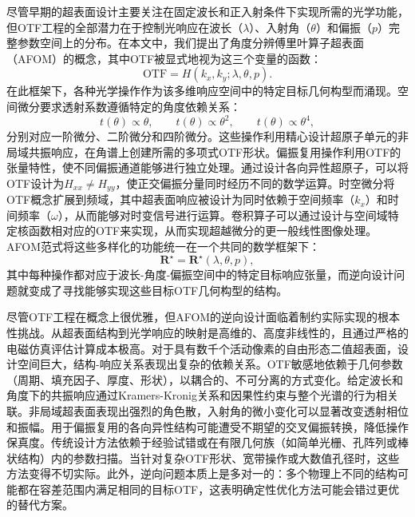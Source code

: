 尽管早期的超表面设计主要关注在固定波长和正入射条件下实现所需的光学功能，但OTF工程的全部潜力在于控制光响应在波长（$\lambda$）、入射角（$\theta$）和偏振（$p$）完整参数空间上的分布。在本文中，我们提出了角度分辨傅里叶算子超表面（AFOM）的概念，其中OTF被显式地视为这三个变量的函数：
\[
\mathrm{OTF} = H(k_x, k_y; \lambda, \theta, p).
\]
在此框架下，各种光学操作作为该多维响应空间中的特定目标几何构型而涌现。空间微分要求透射系数遵循特定的角度依赖关系：
\[
t(\theta) \propto \theta, \qquad
t(\theta) \propto \theta^2, \qquad
t(\theta) \propto \theta^4,
\]
分别对应一阶微分\cite{silva2014}、二阶微分\cite{zhu2017,kwon2018}和四阶微分\cite{qiu2025highorder}。这些操作利用精心设计超原子单元的非局域共振响应，在角谱上创建所需的多项式OTF形状。偏振复用操作利用OTF的张量特性，使不同偏振通道能够进行独立处理\cite{deng2024,cotrufo2023natcom}。通过设计各向异性超原子，可以将OTF设计为$H_{xx} \neq H_{yy}$，使正交偏振分量同时经历不同的数学运算。时空微分将OTF概念扩展到频域，其中超表面响应被设计为同时依赖于空间频率（$k_x$）和时间频率（$\omega$），从而能够对时变信号进行运算\cite{tan2022,cordaro2019}。卷积算子可以通过设计与空间域特定核函数相对应的OTF来实现，从而实现超越微分的更一般线性图像处理\cite{zhou2023tailoring}。AFOM范式将这些多样化的功能统一在一个共同的数学框架下：
\[
\mathbf{R}^\star = \mathbf{R}^\star(\lambda, \theta, p),
\]
其中每种操作都对应于波长-角度-偏振空间中的特定目标响应张量，而逆向设计问题就变成了寻找能够实现这些目标OTF几何构型的结构。

尽管OTF工程在概念上很优雅，但AFOM的逆向设计面临着制约实际实现的根本性挑战。从超表面结构到光学响应的映射是高维的、高度非线性的，且通过严格的电磁仿真评估计算成本极高\cite{molesky2018}。对于具有数千个活动像素的自由形态二值超表面，设计空间巨大，结构-响应关系表现出复杂的依赖关系。OTF敏感地依赖于几何参数（周期、填充因子、厚度、形状），以耦合的、不可分离的方式变化\cite{sell2017}。给定波长和角度下的共振响应通过Kramers-Kronig关系和因果性约束与整个光谱的行为相关联\cite{wesemann2021review}。非局域超表面表现出强烈的角色散，入射角的微小变化可以显著改变透射相位和振幅\cite{guo2018laplace}。用于偏振复用的各向异性结构可能遭受不期望的交叉偏振转换，降低操作保真度\cite{deng2024}。传统设计方法依赖于经验试错或在有限几何族（如简单光栅、孔阵列或棒状结构）内的参数扫描\cite{kwon2018,cordaro2019}。当针对复杂OTF形状、宽带操作或大数值孔径时，这些方法变得不切实际。此外，逆向问题本质上是多对一的：多个物理上不同的结构可能都在容差范围内满足相同的目标OTF，这表明确定性优化方法可能会错过更优的替代方案\cite{piggott2015,piggott2017}。

